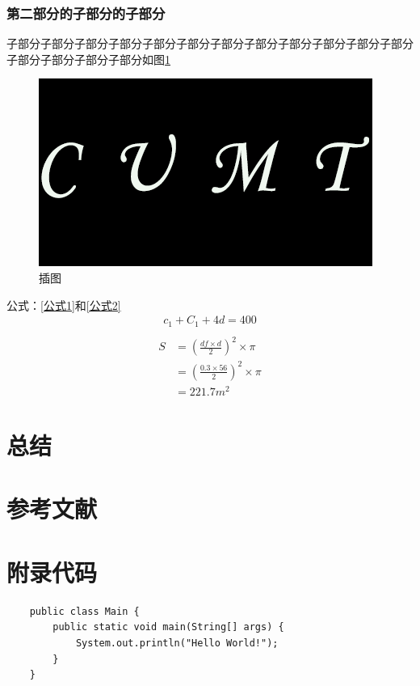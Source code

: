 \documentclass[UTF8,12pt]{ctexart}
\begin{document}
\subsubsection{第二部分的子部分的子部分}
子部分子部分子部分子部分子部分子部分子部分子部分子部分子部分子部分子部分子部分子部分子部分子部分如图\ref{插图1}
\begin{figure}[ht]
    \centering
    \includegraphics{img/cumt.png}
    \caption{插图}
    \label{插图1}
\end{figure}
公式：\eqref{公式1}和\eqref{公式2}
\begin{gather}
    c_1+C_1+4d=400\\
    \label{公式1}
\end{gather}
\begin{align}
    S &= (\frac{df\times d}{2})^2 \times \pi\\
    & = (\frac{0.3 \times 56}{2})^2 \times \pi\\
    & = 221.7m^2
    \label{公式2}
\end{align}
\section{总结}
\newpage
\section*{参考文献}
\newpage
\section*{附录代码}
\lstset{language=java}
\begin{lstlisting}
    public class Main {
        public static void main(String[] args) {
            System.out.println("Hello World!");
        }
    }
\end{lstlisting}
\end{document}
